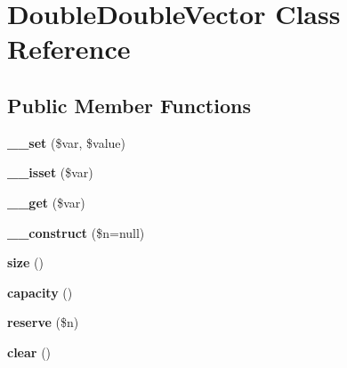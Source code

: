 \hypertarget{class_double_double_vector}{\section{Double\-Double\-Vector Class Reference}
\label{class_double_double_vector}
}
\subsection*{Public Member Functions}
\begin{DoxyCompactItemize}
\item 
\hypertarget{class_double_double_vector_ac087fde45733034f7dfed47ad1fa6312}{{\bfseries \-\_\-\-\_\-set} (\$var, \$value)}\label{class_double_double_vector_ac087fde45733034f7dfed47ad1fa6312}

\item 
\hypertarget{class_double_double_vector_a94886a347cb6f6607de2e9b4ce89f6b0}{{\bfseries \-\_\-\-\_\-isset} (\$var)}\label{class_double_double_vector_a94886a347cb6f6607de2e9b4ce89f6b0}

\item 
\hypertarget{class_double_double_vector_ac7b024da4a1f01f12dca370cc6fad024}{{\bfseries \-\_\-\-\_\-get} (\$var)}\label{class_double_double_vector_ac7b024da4a1f01f12dca370cc6fad024}

\item 
\hypertarget{class_double_double_vector_af31d429119ad2ffcd51550b35eeb948a}{{\bfseries \-\_\-\-\_\-construct} (\$n=null)}\label{class_double_double_vector_af31d429119ad2ffcd51550b35eeb948a}

\item 
\hypertarget{class_double_double_vector_a2814882e188d4cec2656f50aed9e3159}{{\bfseries size} ()}\label{class_double_double_vector_a2814882e188d4cec2656f50aed9e3159}

\item 
\hypertarget{class_double_double_vector_a26af926e93d8b17e0f6c437a424b192c}{{\bfseries capacity} ()}\label{class_double_double_vector_a26af926e93d8b17e0f6c437a424b192c}

\item 
\hypertarget{class_double_double_vector_a91bb1ac158a0d5ddb28ffe64ea441ae0}{{\bfseries reserve} (\$n)}\label{class_double_double_vector_a91bb1ac158a0d5ddb28ffe64ea441ae0}

\item 
\hypertarget{class_double_double_vector_af1daec7cbe66a52178d049653afff025}{{\bfseries clear} ()}\label{class_double_double_vector_af1daec7cbe66a52178d049653afff025}


\end{DoxyCompactItemize}
